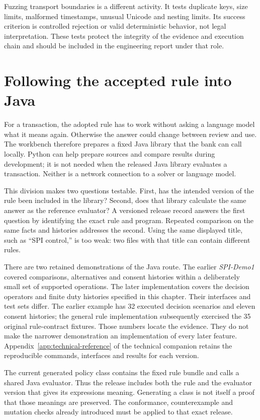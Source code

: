 \documentclass[12pt,a4paper,oneside,openany]{book}
\begin{document}
Fuzzing transport boundaries is a different activity. It tests duplicate keys,
size limits, malformed timestamps, unusual Unicode and nesting limits. Its
success criterion is controlled rejection or valid deterministic behavior, not
legal interpretation. These tests protect the integrity of the evidence and
execution chain and should be included in the engineering report under that role.

\section{Following the accepted rule into Java}
\label{sec:reader-java}

For a transaction, the adopted rule has to work without asking a language model
what it means again. Otherwise the answer could change between review and use.
The workbench therefore prepares a fixed Java library that the bank can call
locally. Python can help prepare sources and compare results during development;
it is not needed when the released Java library evaluates a transaction. Neither
is a network connection to a solver or language model.

This division makes two questions testable. First, has the intended version of
the rule been included in the library? Second, does that library calculate the
same answer as the reference evaluator? A versioned release record answers the
first question by identifying the exact rule and program. Repeated comparison
on the same facts and histories addresses the second. Using the same displayed
title, such as ``SPI control,'' is too weak: two files with that title can
contain different rules.

There are two retained demonstrations of the Java route. The earlier
\emph{SPI-Demo1} covered comparisons, alternatives and consent histories within
a deliberately small set of supported operations. The later implementation
covers the decision operators and finite duty histories specified in this
chapter. Their interfaces and test sets differ. The earlier example has 32
executed decision scenarios and eleven consent histories; the general rule
implementation subsequently exercised the 35 original rule-contract fixtures.
Those numbers locate the evidence. They do not make the narrower demonstration
an implementation of every later feature. Appendix~\ref{app:technical-reference} of the technical companion
retains the reproducible commands, interfaces and results for each version.

The current generated policy class contains the fixed rule bundle and calls a
shared Java evaluator. Thus the release includes both the rule and the evaluator
version that gives its expressions meaning. Generating a class is not itself a
proof that those meanings are preserved. The conformance, counterexample and
mutation checks already introduced must be applied to that exact release.
\end{document}
